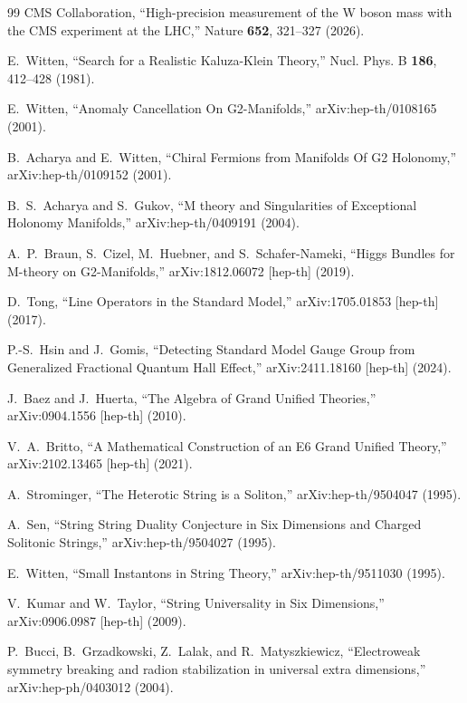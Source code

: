 \begin{thebibliography}{99}
CMS Collaboration, ``High-precision measurement of the W boson mass with the CMS experiment at the LHC,'' Nature \textbf{652}, 321--327 (2026).

E.~Witten, ``Search for a Realistic Kaluza-Klein Theory,'' Nucl. Phys. B \textbf{186}, 412--428 (1981).

E.~Witten, ``Anomaly Cancellation On G2-Manifolds,'' arXiv:hep-th/0108165 (2001).

B.~Acharya and E.~Witten, ``Chiral Fermions from Manifolds Of G2 Holonomy,'' arXiv:hep-th/0109152 (2001).

B.~S.~Acharya and S.~Gukov, ``M theory and Singularities of Exceptional Holonomy Manifolds,'' arXiv:hep-th/0409191 (2004).

A.~P.~Braun, S.~Cizel, M.~Huebner, and S.~Schafer-Nameki, ``Higgs Bundles for M-theory on G2-Manifolds,'' arXiv:1812.06072 [hep-th] (2019).

D.~Tong, ``Line Operators in the Standard Model,'' arXiv:1705.01853 [hep-th] (2017).

P.-S.~Hsin and J.~Gomis, ``Detecting Standard Model Gauge Group from Generalized Fractional Quantum Hall Effect,'' arXiv:2411.18160 [hep-th] (2024).

J.~Baez and J.~Huerta, ``The Algebra of Grand Unified Theories,'' arXiv:0904.1556 [hep-th] (2010).

V.~A.~Britto, ``A Mathematical Construction of an E6 Grand Unified Theory,'' arXiv:2102.13465 [hep-th] (2021).

A.~Strominger, ``The Heterotic String is a Soliton,'' arXiv:hep-th/9504047 (1995).

A.~Sen, ``String String Duality Conjecture in Six Dimensions and Charged Solitonic Strings,'' arXiv:hep-th/9504027 (1995).

E.~Witten, ``Small Instantons in String Theory,'' arXiv:hep-th/9511030 (1995).

V.~Kumar and W.~Taylor, ``String Universality in Six Dimensions,'' arXiv:0906.0987 [hep-th] (2009).

P.~Bucci, B.~Grzadkowski, Z.~Lalak, and R.~Matyszkiewicz, ``Electroweak symmetry breaking and radion stabilization in universal extra dimensions,'' arXiv:hep-ph/0403012 (2004).


\end{thebibliography}
